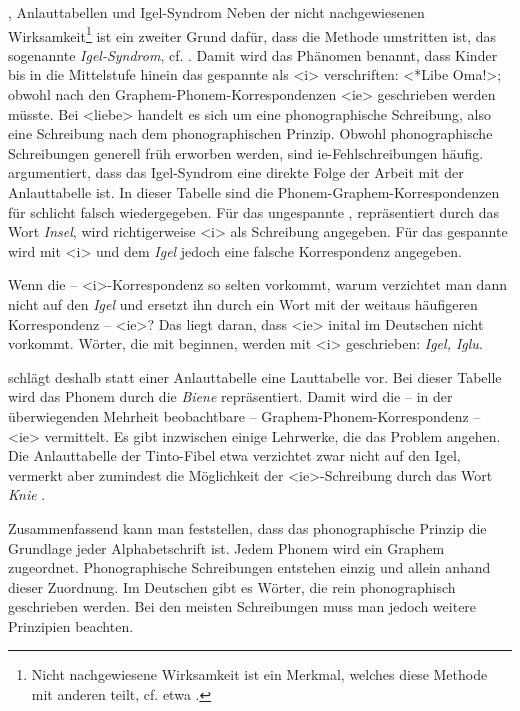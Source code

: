 \begin{Exkurs}{, Anlauttabellen und Igel-Syndrom}
Neben der nicht nachgewiesenen Wirksamkeit\footnote{Nicht nachgewiesene Wirksamkeit ist ein Merkmal, welches diese Methode mit anderen teilt, cf. etwa \citet{BruegelmannBrinkmann2012}.} ist ein zweiter Grund dafür, dass die Methode umstritten ist, das sogenannte \textit{Igel-Syndrom}, cf. \citet[71]{Thome2019}. Damit wird das Phänomen benannt, dass Kinder bis in die Mittelstufe hinein das gespannte  als <i> verschriften: <*Libe Oma!>; obwohl nach den Graphem-Phonem-Korrespondenzen <ie> geschrieben werden müsste. Bei <liebe> handelt es sich um eine phonographische Schreibung, also eine Schreibung nach dem phonographischen Prinzip. Obwohl phonographische Schreibungen generell früh erworben werden, sind ie-Fehlschreibungen häufig. \citet{Thome2000} argumentiert, dass das Igel-Syndrom eine direkte Folge der Arbeit mit der Anlauttabelle ist. In dieser Tabelle sind die Phonem-Graphem-Korrespondenzen für  schlicht falsch wiedergegeben. Für das ungespannte , repräsentiert durch das Wort \textit{Insel}, wird richtigerweise <i> als Schreibung angegeben. Für das gespannte  wird mit <i> und dem \textit{Igel} jedoch eine falsche Korrespondenz angegeben.

Wenn die  -- <i>-Korrespondenz so selten vorkommt, warum verzichtet man dann nicht auf den \textit{Igel} und ersetzt ihn durch ein Wort mit der weitaus häufigeren Korrespondenz  -- <ie>? Das liegt daran, dass <ie> inital im Deutschen nicht vorkommt. Wörter, die mit  beginnen, werden mit <i> geschrieben: \textit{Igel, Iglu}. 

\citet[117]{Thome2000} schlägt deshalb statt einer Anlauttabelle eine Lauttabelle vor. Bei dieser Tabelle wird das Phonem  durch die \textit{Biene} repräsentiert. Damit wird die -- in der überwiegenden Mehrheit beobachtbare -- Graphem-Phonem-Korrespondenz  -- <ie> vermittelt. Es gibt inzwischen einige Lehrwerke, die das Problem angehen. Die Anlauttabelle der Tinto-Fibel etwa verzichtet zwar nicht auf den Igel, vermerkt aber zumindest die Möglichkeit der <ie>-Schreibung durch das Wort \textit{Knie} \citep[114]{Tintofibel}.
\end{Exkurs}

Zusammenfassend kann man feststellen, dass das phonographische Prinzip die Grundlage jeder Alphabetschrift ist. Jedem Phonem wird ein Graphem zugeordnet. Phonographische Schreibungen entstehen einzig und allein anhand dieser Zuordnung. Im Deutschen gibt es Wörter, die rein phonographisch geschrieben werden. Bei den meisten Schreibungen muss man jedoch weitere Prinzipien beachten.

